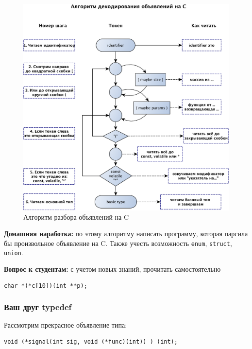 \documentclass[a4paper,12pt,oneside]{article}
\newif\ifanswers
\begin{document}
\begin{figure}[h!]
\centering
\includegraphics[width=1.0\textwidth]{illustrations/cdecls-crop.pdf}
\caption{Алгоритм разбора объявлений на C}
\label{fig:cdecl_parse}
\end{figure}

\textbf{Домашняя наработка:} по этому алгоритму написать программу, которая парсила бы произвольное объявление на C. Также учесть возможность \lstinline!enum!, \lstinline!struct!, \lstinline!union!.

\textbf{Вопрос к студентам:} с учетом новых знаний, прочитать самостоятельно

\begin{lstlisting}
char *(*c[10])(int **p);
\end{lstlisting}

\ifanswers
Ответ: c is array of 10 pointers to functions, accepting pointer to pointer to int and returning pointer to char.
\fi

\subsubsection{Ваш друг typedef}\label{FriendTypedef}

Рассмотрим прекрасное объявление типа:

\begin{lstlisting}
void (*signal(int sig, void (*func)(int)) ) (int);
\end{lstlisting}
\end{document}
